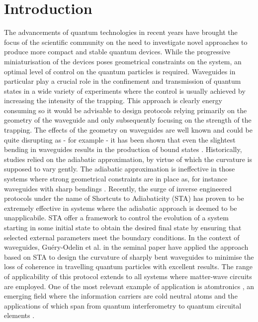 \section{Introduction}
The advancements of quantum technologies in  recent years have brought the focus of the scientific community on the need to investigate novel approaches to produce more compact and stable quantum devices.
While the progressive miniaturisation of the devices poses geometrical constraints on the system, an optimal level of control on the quantum particles is required.
Waveguides in particular play a crucial role in the confinement and transmission of quantum states in a wide variety of experiments where the control is usually achieved by increasing the intensity of the trapping.
This approach is clearly energy consuming so it would be advisable to design protocols relying primarily on the geometry of the waveguide and only subsequently focusing on the strength of the trapping.
The effects of the geometry on waveguides are well known and could be quite disrupting as - for example - it has been shown that even the slightest bending in waveguides results in the production of bound states \cite{BoundStatesInGoldst1992}.
Historically, studies relied on the adiabatic approximation, by virtue of which the curvature is supposed to vary gently.
The adiabatic approximation is ineffective in those systems where strong geometrical constraints are in place as, for instance waveguides with sharp bendings \cite{BoundStatesInClark1996, BoundStatesInBittne2013, MultipleBoundCarini1993}.
Recently, the surge of inverse engineered protocols under the name of Shortcuts to Adiabaticity  \cite{ShortcutsToAdGuery2019} (STA) has proven to be extremely effective in systems where the adiabatic approach is deemed to be unapplicabile.
STA offer a framework to control the evolution of a system starting in some initial state to obtain the desired final state by ensuring that selected external parameters meet the boundary conditions.
In the context of waveguides, Gu\'ery-Odelin et al. in the seminal paper \cite{QuantumControlImpens2020} have applied the approach based on STA to design the curvature of sharply bent waveguides to minimise the loss of coherence in travelling quantum particles with excellent results.
The range of applicability of this protocol extends to all systems where matter-wave circuits are employed.
One of the most relevant example of application is atomtronics \cite{RoadmapOnAtomAmico2021}, an emerging field where the information carriers are cold neutral atoms and the applications of which span from quantum interferometry \cite{MagneticallyGuQiLu2017, 80kmomentumSeMcdona2013} to quantum circuital elements \cite{FocusOnAtomtrAmico2017, AdvancesInAtoPepino2021}.
